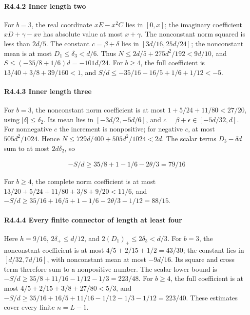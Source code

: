 \paragraph{R4.4.2 Inner length two}

For \(b=3\), the real coordinate \(xE-x^2C\) lies in \([0,\allowbreak \allowbreak  x]\); the imaginary coefficient \(xD+\gamma-xv\) has absolute value at most \(x+\gamma\). The nonconstant norm squared is less than \(2d/5\). The constant \(c=\beta+\delta\) lies in \([3d/16,\allowbreak \allowbreak  25d/24]\); the nonconstant mean is at most \(D_1\le \delta_3<d/6\). Thus \(N\le2d/5+275d^2/192<9d/10\), and \(S\le(-35/8+1/6)d=-101d/24\). For \(b\ge4\), the full coefficient is \(13/40+3/8+39/160<1\), and \(S/d\le-35/16-16/5+1/6+1/12<-5\).

\paragraph{R4.4.3 Inner length three}

For \(b=3\), the nonconstant norm coefficient is at most \(1+5/24+11/80<27/20\), using \(|\delta|\le \delta_2\). Its mean lies in \([-3d/2,\allowbreak \allowbreak -5d/6]\), and \(c=\beta+\epsilon\in[-5d/32,\allowbreak \allowbreak  d]\). For nonnegative \(c\) the increment is nonpositive; for negative \(c\), at most \(505d^2/1024\). Hence \(N\le729d/400+505d^2/1024<2d\). The scalar terms \(D_3-\delta d\) sum to at most \(2d \delta_2\), so

\[
\begin{gathered}
-S/d\ge 35/8+1-1/6-2\theta/3=79/16
\end{gathered}
\]

For \(b\ge4\), the complete norm coefficient is at most \(13/20+5/24+11/80+3/8+9/20<11/6\), and \(-S/d\ge35/16+16/5+1-1/6-2\theta/3-1/12=88/15\).

\paragraph{R4.4.4 Every finite connector of length at least four}

Here \(h=9/16\), \(2\delta_+\le d/12\), and \(2(D_1)_+\le2 \delta_3<d/3\). For \(b=3\), the nonconstant coefficient is at most \(4/5+2/15+1/2=43/30\); the constant lies in \([d/32,\allowbreak \allowbreak  7d/16]\), with nonconstant mean at most \(-9d/16\). Its square and cross term therefore sum to a nonpositive number. The scalar lower bound is \(-S/d\ge35/8+11/16-1/12-1/3=223/48\). For \(b\ge4\), the full coefficient is at most \(4/5+2/15+3/8+27/80<5/3\), and \(-S/d\ge35/16+16/5+11/16-1/12-1/3-1/12=223/40\). These estimates cover every finite \(n=L-1\).

